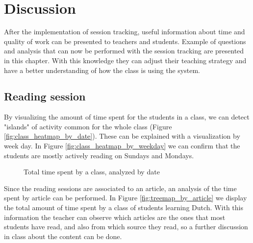 \chapter{Discussion}\label{p04:discussion}
After the implementation of session tracking, useful information about time and quality of work can be presented to teachers and students. Example of questions and analysis that can now be performed with the session tracking are presented in this chapter.
With this knowledge they can adjust their teaching strategy and have a better understanding of how the class is using the system.

\section{Reading session}

By visualizing the amount of time spent for the students in a class, we can detect "islands" of activity common for the whole class (Figure \ref{fig:class_heatmap_by_date}). These can be explained with a visualization by week day. In Figure \ref{fig:class_heatmap_by_weekday} we can confirm that the students are mostly actively reading on Sundays and Mondays.

\begin{figure}[bth]
	\myfloatalign
	 \quad 
	 \quad
	\caption{Total time spent by a class, analyzed by date}
\end{figure}


Since the reading sessions are associated to an article, an analysis of the time spent by article can be performed. In Figure \ref{fig:treemap_by_article} we display the total amount of time spent by a class of students learning Dutch. With this information the teacher can observe which articles are the ones that most students have read, and also from which source they read, so a further discussion in class about the content can be done.

